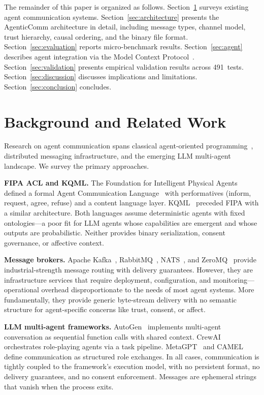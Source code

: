 \documentclass[10pt, twocolumn]{article}
\begin{document}
The remainder of this paper is organized as follows. Section~\ref{sec:related} surveys existing agent communication systems. Section~\ref{sec:architecture} presents the AgenticComm architecture in detail, including message types, channel model, trust hierarchy, causal ordering, and the binary file format. Section~\ref{sec:evaluation} reports micro-benchmark results. Section~\ref{sec:agent} describes agent integration via the Model Context Protocol~\cite{mcp2024}. Section~\ref{sec:validation} presents empirical validation results across 491~tests. Section~\ref{sec:discussion} discusses implications and limitations. Section~\ref{sec:conclusion} concludes.


\section{Background and Related Work}
\label{sec:related}

Research on agent communication spans classical agent-oriented programming~\cite{shoham1993agent, woolridge1995intelligent}, distributed messaging infrastructure, and the emerging LLM multi-agent landscape. We survey the primary approaches.

\textbf{FIPA ACL and KQML.} The Foundation for Intelligent Physical Agents defined a formal Agent Communication Language~\cite{fipa2002} with performatives (inform, request, agree, refuse) and a content language layer. KQML~\cite{kqml1994} preceded FIPA with a similar architecture. Both languages assume deterministic agents with fixed ontologies---a poor fit for LLM agents whose capabilities are emergent and whose outputs are probabilistic. Neither provides binary serialization, consent governance, or affective context.

\textbf{Message brokers.} Apache Kafka~\cite{kafka2011}, RabbitMQ~\cite{rabbitmq2012}, NATS~\cite{nats2021}, and ZeroMQ~\cite{zeromq2013} provide industrial-strength message routing with delivery guarantees. However, they are infrastructure services that require deployment, configuration, and monitoring---operational overhead disproportionate to the needs of most agent systems. More fundamentally, they provide generic byte-stream delivery with no semantic structure for agent-specific concerns like trust, consent, or affect.

\textbf{LLM multi-agent frameworks.} AutoGen~\cite{autogen2023} implements multi-agent conversation as sequential function calls with shared context. CrewAI~\cite{crewai2024} orchestrates role-playing agents via a task pipeline. MetaGPT~\cite{hong2023metagpt} and CAMEL~\cite{li2023camel} define communication as structured role exchanges. In all cases, communication is tightly coupled to the framework's execution model, with no persistent format, no delivery guarantees, and no consent enforcement. Messages are ephemeral strings that vanish when the process exits.
\end{document}
